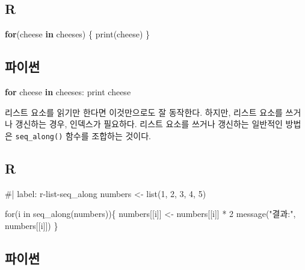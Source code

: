 \documentclass[
  letterpaper,
]{book}
\newenvironment{Shaded}{\begin{snugshade}}{\end{snugshade}}
\newcommand{\BuiltInTok}[1]{\textcolor[rgb]{0.00,0.23,0.31}{#1}}
\newcommand{\ControlFlowTok}[1]{\textcolor[rgb]{0.00,0.23,0.31}{\textbf{#1}}}
\newcommand{\FunctionTok}[1]{\textcolor[rgb]{0.28,0.35,0.67}{#1}}
\newcommand{\KeywordTok}[1]{\textcolor[rgb]{0.00,0.23,0.31}{\textbf{#1}}}
\newcommand{\NormalTok}[1]{\textcolor[rgb]{0.00,0.23,0.31}{#1}}
\begin{document}
\subsection*{R}\label{r-49}

\begin{Shaded}
\begin{Highlighting}[]
\ControlFlowTok{for}\NormalTok{(cheese }\ControlFlowTok{in}\NormalTok{ cheeses) \{}
  \FunctionTok{print}\NormalTok{(cheese)}
\NormalTok{\}}
\end{Highlighting}
\end{Shaded}

\subsection*{파이썬}\label{uxd30cuxc774uxc36c-49}

\begin{Shaded}
\begin{Highlighting}[]
\ControlFlowTok{for}\NormalTok{ cheese }\KeywordTok{in}\NormalTok{ cheeses:}
    \BuiltInTok{print}\NormalTok{ cheese}
\end{Highlighting}
\end{Shaded}

리스트 요소를 읽기만 한다면 이것만으로도 잘 동작한다. 하지만, 리스트
요소를 쓰거나 갱신하는 경우, 인덱스가 필요하다. 리스트 요소를 쓰거나
갱신하는 일반적인 방법은 \texttt{seq\_along()} 함수를 조합하는 것이다.
 

\subsection{R}

\begin{Shaded}
\begin{Highlighting}[]
\NormalTok{\#| label: r{-}list{-}seq\_along}
\NormalTok{numbers \textless{}{-} list(1, 2, 3, 4, 5)}

\NormalTok{for(i in seq\_along(numbers))\{}
\NormalTok{  numbers[[i]] \textless{}{-} numbers[[i]] * 2}
\NormalTok{  message("결과:", numbers[[i]])}
\NormalTok{\}}
\end{Highlighting}
\end{Shaded}

\subsection{파이썬}
\end{document}
